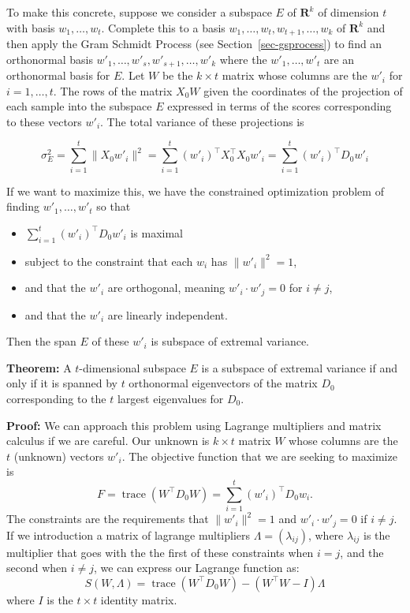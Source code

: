\documentclass[
  11pt,
  letterpaper,
]{scrbook}
\providecommand{\tightlist}{%
  \setlength{\itemsep}{0pt}\setlength{\parskip}{0pt}}\usepackage{longtable,booktabs,array}
\theoremstyle{plain}
\theoremstyle{remark}
\begin{document}
To make this concrete, suppose we consider a subspace \(E\) of
\(\mathbf{R}^{k}\) of dimension \(t\) with basis
\(w_{1},\ldots, w_{t}\). Complete this to a basis
\(w_{1},\ldots, w_{t},w_{t+1},\ldots, w_{k}\) of \(\mathbf{R}^{k}\) and
then apply the Gram Schmidt Process (see Section~\ref{sec-gsprocess}) to
find an orthonormal basis
\(w'_{1},\ldots,w'_{s},w'_{s+1},\ldots, w'_{k}\) where the
\(w'_{1},\ldots, w'_{t}\) are an orthonormal basis for \(E\). Let \(W\)
be the \(k\times t\) matrix whose columns are the \(w'_{i}\) for
\(i=1,\ldots,t\). The rows of the matrix \(X_{0}W\) given the
coordinates of the projection of each sample into the subspace \(E\)
expressed in terms of the scores corresponding to these vectors
\(w'_{i}\). The total variance of these projections is

\[
\sigma_{E}^2 = \sum_{i=1}^{t} \|X_{0}w'_{i}\|^2 = \sum_{i=1}^{t} (w'_{i})^{\intercal}X_{0}^{\intercal}X_{0}w'_{i}  = \sum_{i=1}^{t} (w'_{i})^{\intercal}D_{0}w'_{i}
\]

If we want to maximize this, we have the constrained optimization
problem of finding \(w'_{1},\ldots, w'_{t}\) so that

\begin{itemize}
\tightlist
\item
  \(\sum_{i=1}^{t} (w'_{i})^{\intercal}D_{0}w'_{i}\) is maximal
\item
  subject to the constraint that each \(w_{i}\) has \(\|w'_{i}\|^2=1\),
\item
  and that the \(w'_{i}\) are orthogonal, meaning
  \(w'_{i}\cdot w'_{j}=0\) for \(i\not=j\),
\item
  and that the \(w'_{i}\) are linearly independent.
\end{itemize}

Then the span \(E\) of these \(w'_{i}\) is subspace of extremal
variance.

\textbf{Theorem:} A \(t\)-dimensional subspace \(E\) is a subspace of
extremal variance if and only if it is spanned by \(t\) orthonormal
eigenvectors of the matrix \(D_{0}\) corresponding to the \(t\) largest
eigenvalues for \(D_{0}\).

\textbf{Proof:} We can approach this problem using Lagrange multipliers
and matrix calculus if we are careful. Our unknown is \(k\times t\)
matrix \(W\) whose columns are the \(t\) (unknown) vectors \(w'_{i}\).
The objective function that we are seeking to maximize is \[
F = \mathop{trace}(W^{\intercal}D_{0}W) = \sum_{i=1}^{t} (w'_{i})^{\intercal}D_{0}w_{i}.
\] The constraints are the requirements that \(\|w'_{i}\|^2=1\) and
\(w'_{i}\cdot w'_{j}=0\) if \(i\not=j\). If we introduction a matrix of
lagrange multipliers \(\Lambda=(\lambda_{ij})\), where \(\lambda_{ij}\)
is the multiplier that goes with the the first of these constraints when
\(i=j\), and the second when \(i\not=j\), we can express our Lagrange
function as: \[
S(W,\Lambda) = \mathop{trace}(W^{\intercal}D_{0}W) - (W^{\intercal}W-I)\Lambda
\] where \(I\) is the \(t\times t\) identity matrix.
\end{document}
